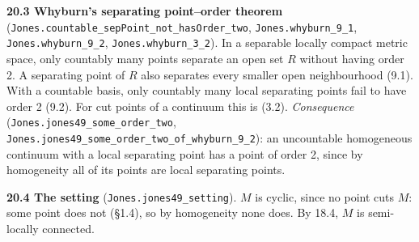 \documentclass[11pt]{article}
\newcommand{\lean}[1]{\texttt{#1}}
\begin{document}
\textbf{20.3 Whyburn's separating point--order theorem} (\lean{Jones.\hspace{0pt}countable\_\hspace{0pt}sepPoint\_\hspace{0pt}not\_\hspace{0pt}hasOrder\_\hspace{0pt}two}, \lean{Jones.\hspace{0pt}whyburn\_\hspace{0pt}9\_\hspace{0pt}1}, \lean{Jones.\hspace{0pt}whyburn\_\hspace{0pt}9\_\hspace{0pt}2}, \lean{Jones.\hspace{0pt}whyburn\_\hspace{0pt}3\_\hspace{0pt}2}). In a separable locally compact metric space, only countably many points separate an open set $R$ without having order 2. A separating point of $R$ also separates every smaller open neighbourhood (9.1). With a countable basis, only countably many local separating points fail to have order 2 (9.2). For cut points of a continuum this is (3.2). \emph{Consequence} (\lean{Jones.\hspace{0pt}jones49\_\hspace{0pt}some\_\hspace{0pt}order\_\hspace{0pt}two}, \lean{Jones.\hspace{0pt}jones49\_\hspace{0pt}some\_\hspace{0pt}order\_\hspace{0pt}two\_\hspace{0pt}of\_\hspace{0pt}whyburn\_\hspace{0pt}9\_\hspace{0pt}2}): an uncountable homogeneous continuum with a local separating point has a point of order 2, since by homogeneity all of its points are local separating points.

\textbf{20.4 The setting} (\lean{Jones.\hspace{0pt}jones49\_\hspace{0pt}setting}). $M$ is cyclic, since no point cuts $M$: some point does not (\S{}1.4), so by homogeneity none does. By 18.4, $M$ is semi-locally connected.
\end{document}
